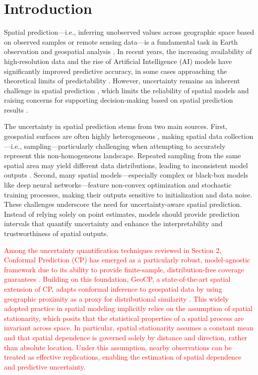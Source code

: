 \documentclass[authoryear,preprint,review,12pt]{elsarticle}
\begin{document}
\linenumbers


\section{Introduction}

Spatial prediction—i.e., inferring unobserved values across geographic space based on observed samples or remote sensing data—is a fundamental task in Earth observation and geospatial analysis \citep{jiang2018survey,luo2023generalized}. In recent years, the increasing availability of high-resolution data and the rise of Artificial Intelligence (AI) models have significantly improved predictive accuracy, in some cases approaching the theoretical limits of predictability \citep{zhu2023intelligent}. However, uncertainty remains an inherent challenge in spatial prediction \citep{meyer2021predicting}, which limits the reliability of spatial models and raising concerns for supporting decision-making based on spatial prediction results \citep{goodchild2021replication,li2024geoai}.

The uncertainty in spatial prediction stems from two main sources. First, geospatial surfaces are often highly heterogeneous \citep{luo2022identifying}, making spatial data collection—i.e., sampling—particularly challenging when attempting to accurately represent this non-homogeneous landscape. Repeated sampling from the same spatial area may yield different data distributions, leading to inconsistent model outputs \citep{wang2002spatial}. Second, many spatial models—especially complex or black-box models like deep neural networks—feature non-convex optimization and stochastic training processes, making their outputs sensitive to initialization and data noise. These challenges underscore the need for uncertainty-aware spatial prediction. Instead of relying solely on point estimates, models should provide prediction intervals that quantify uncertainty and enhance the interpretability and trustworthiness of spatial outputs.


\textcolor{red}{Among the uncertainty quantification techniques reviewed in Section 2, Conformal Prediction (CP) has emerged as a particularly robust, model-agnostic framework due to its ability to provide finite-sample, distribution-free coverage guarantees \citep{angelopoulos2023conformal}. Building on this foundation, GeoCP, a state-of-the-art spatial extension of CP, adapts conformal inference to geospatial data by using geographic proximity as a proxy for distributional similarity \citep{lou2025geoconformal}. This widely adopted practice in spatial modeling implicitly relies on the assumption of spatial stationarity, which posits that the statistical properties of a spatial process are invariant across space. In particular, spatial stationarity assumes a constant mean and that spatial dependence is governed solely by distance and direction, rather than absolute location. Under this assumption, nearby observations can be treated as effective replications, enabling the estimation of spatial dependence and predictive uncertainty.}
\end{document}
